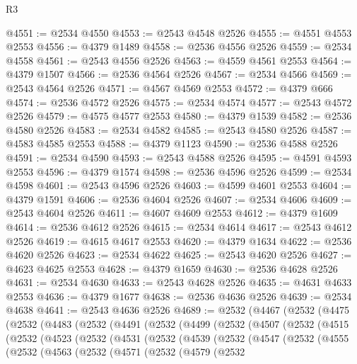 \begin{lexlean}{R3}
\begin{coremodule}
@4551 := @2534 @4550
@4553 := @2543 @4548 @2526
@4555 := @4551 @4553 @2553
@4556 := @4379 @1489
@4558 := @2536 @4556 @2526
@4559 := @2534 @4558
@4561 := @2543 @4556 @2526
@4563 := @4559 @4561 @2553
@4564 := @4379 @1507
@4566 := @2536 @4564 @2526
@4567 := @2534 @4566
@4569 := @2543 @4564 @2526
@4571 := @4567 @4569 @2553
@4572 := @4379 @666
@4574 := @2536 @4572 @2526
@4575 := @2534 @4574
@4577 := @2543 @4572 @2526
@4579 := @4575 @4577 @2553
@4580 := @4379 @1539
@4582 := @2536 @4580 @2526
@4583 := @2534 @4582
@4585 := @2543 @4580 @2526
@4587 := @4583 @4585 @2553
@4588 := @4379 @1123
@4590 := @2536 @4588 @2526
@4591 := @2534 @4590
@4593 := @2543 @4588 @2526
@4595 := @4591 @4593 @2553
@4596 := @4379 @1574
@4598 := @2536 @4596 @2526
@4599 := @2534 @4598
@4601 := @2543 @4596 @2526
@4603 := @4599 @4601 @2553
@4604 := @4379 @1591
@4606 := @2536 @4604 @2526
@4607 := @2534 @4606
@4609 := @2543 @4604 @2526
@4611 := @4607 @4609 @2553
@4612 := @4379 @1609
@4614 := @2536 @4612 @2526
@4615 := @2534 @4614
@4617 := @2543 @4612 @2526
@4619 := @4615 @4617 @2553
@4620 := @4379 @1634
@4622 := @2536 @4620 @2526
@4623 := @2534 @4622
@4625 := @2543 @4620 @2526
@4627 := @4623 @4625 @2553
@4628 := @4379 @1659
@4630 := @2536 @4628 @2526
@4631 := @2534 @4630
@4633 := @2543 @4628 @2526
@4635 := @4631 @4633 @2553
@4636 := @4379 @1677
@4638 := @2536 @4636 @2526
@4639 := @2534 @4638
@4641 := @2543 @4636 @2526
@4689 := @2532
    (@4467
      (@2532
        (@4475
          (@2532
            (@4483
              (@2532
                (@4491
                  (@2532
                    (@4499
                      (@2532
                        (@4507
                          (@2532
                            (@4515
                              (@2532
                                (@4523
                                  (@2532
                                    (@4531
                                      (@2532
                                        (@4539
                                          (@2532
                                            (@4547
                                              (@2532
                                                (@4555
                                                  (@2532
                                                    (@4563
                                                      (@2532
                                                        (@4571
                                                          (@2532
                                                            (@4579
                                                              (@2532

\end{coremodule}
\end{lexlean}
